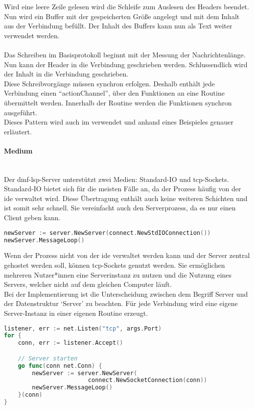 \documentclass[./einleitung.tex]{subfiles}
\begin{document}
    Wird eine leere Zeile gelesen wird die Schleife zum Auslesen des Headers beendet.\\
    Nun wird ein Buffer mit der gespeicherten Größe angelegt und mit dem Inhalt aus der Verbindung befüllt.
    Der Inhalt des Buffers kann nun als Text weiter verwendet werden.
    \\\\
    Das Schreiben im Basisprotokoll beginnt mit der Messung der Nachrichtenlänge.
    Nun kann der Header in die Verbindung geschrieben werden.
    Schlussendlich wird der Inhalt in die Verbindung geschrieben.\\
    Diese Schreibvorgänge müssen synchron erfolgen.
    Deshalb enthält jede Verbindung einen ``actionChannel'', über den Funktionen an eine Routine übermittelt werden.
    Innerhalb der Routine werden die Funktionen synchron ausgeführt.\\
    Dieses Pattern wird auch im  verwendet und anhand eines Beispieles genauer erläutert.

    \paragraph{Medium}\mbox{}\\
    Der \acrshort{dmf}-\acrshort{lsp}-Server unterstützt zwei Medien: Standard-IO und \acrshort{tcp}-Sockets.\\
    Standard-IO bietet sich für die meisten Fälle an, da der Prozess häufig von der \acrshort{ide} verwaltet wird.
    Diese Übertragung enthält auch keine weiteren Schichten und ist somit sehr schnell.
    Sie vereinfacht auch den Serverprozess, da es nur einen Client geben kann.
    \begin{lstlisting}[language=Go, caption=Start eines Standard-IO-Servers, label=lst:stdServer]
newServer := server.NewServer(connect.NewStdIOConnection())
newServer.MessageLoop()
    \end{lstlisting}
    Wenn der Prozess nicht von der \acrshort{ide} verwaltet werden kann und der Server zentral gehostet werden soll, können \acrshort{tcp}-Sockets genutzt werden.
    Sie ermöglichen mehreren Nutzer*innen eine Serverinstanz zu nutzen und die Nutzung eines Servers, welcher nicht auf dem gleichen Computer läuft.\\
    Bei der Implementierung ist die Unterscheidung zwischen dem Begriff Server und der Datenstruktur `Server' zu beachten.
    Für jede Verbindung wird eine eigene Server-Instanz in einer eigenen Routine erzeugt.
    \begin{lstlisting}[language=Go, caption=Verwaltung des \acrshort{tcp}-Servers, label=lst:tcpServer]
listener, err := net.Listen("tcp", args.Port)
for {
    conn, err := listener.Accept()

    // Server starten
    go func(conn net.Conn) {
        newServer := server.NewServer(
                        connect.NewSocketConnection(conn))
        newServer.MessageLoop()
    }(conn)
}
    \end{lstlisting}
\end{document}
